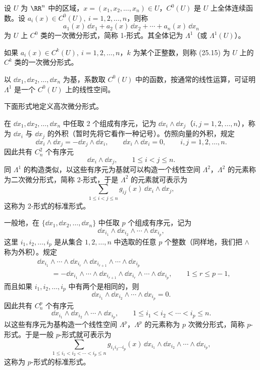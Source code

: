 设 $U$ 为 $\RR^n$ 中的区域，$x=(x_1,x_2,\ldots,x_n)\in U$，$C^0(U)$ 是 $U$ 上全体连续函数。设 $a_i(x)\in C^0(U),\ i=1,2,\ldots,n$，则称
\begin{equation}
  a_1(x)\,\dd x_1+a_2(x)\,\dd x_2+\cdots+a_n(x)\,\dd x_n
  \tag{25.15}
\end{equation}
为 $U$ 上 $C^0$ 类的一次微分形式，简称 1-形式。其全体记为 $\Lambda^1$（或 $\Lambda^1(U)$）。

\begin{xremark}
如果 $a_i(x)\in C^k(U),\ i=1,2,\ldots,n$，$k$ 为某个正整数，则称 (25.15) 为 $U$ 上的 $C^k$ 类的一次微分形式。
\end{xremark}

\begin{xremark}
以 $\dd x_1,\dd x_2,\ldots,\dd x_n$ 为基，系数取 $C^0(U)$ 中的函数，按通常的线性运算，可证明 $\Lambda^1$ 是一个 $C^0(U)$ 上的线性空间。
\end{xremark}

下面形式地定义高次微分形式。

在 $\dd x_1,\dd x_2,\ldots,\dd x_n$ 中任取 2 个组成有序元，记为 $\dd x_i\wedge\dd x_j$（$i,j=1,2,\ldots,n$），称为 $\dd x_i$ 与 $\dd x_j$ 的外积（暂时先将它看作一种记号）。仿照向量的外积，规定
\[
  \dd x_i\wedge\dd x_j=-\dd x_j\wedge\dd x_i,\qquad
  \dd x_i\wedge\dd x_i=0,
  \qquad i,j=1,2,\ldots,n.
\]
因此共有 $C_n^2$ 个有序元
\[
  \dd x_i\wedge\dd x_j,\qquad1\le i<j\le n.
\]
同 $\Lambda^1$ 的构造类似，以这些有序元为基就可以构造一个线性空间 $\Lambda^2$，$\Lambda^2$ 的元素称为二次微分形式，简称 2-形式，于是 $\Lambda^2$ 的元素就可表示为
\[
  \sum_{1\le i<j\le n}g_{ij}(x)\,\dd x_i\wedge\dd x_j,
\]
这称为 2-形式的标准形式。

一般地，在 $\{\dd x_1,\dd x_2,\ldots,\dd x_n\}$ 中任取 $p$ 个组成有序元，记为
\[
  \dd x_{i_1}\wedge\dd x_{i_2}\wedge\cdots\wedge\dd x_{i_p},
\]
这里 $i_1,i_2,\ldots,i_p$ 是从集合 $1,2,\ldots,n$ 中选取的任意 $p$ 个整数（同样地，我们把 $\wedge$ 称为外积）。规定
\begin{align*}
&\dd x_{i_1}\wedge\cdots\wedge\dd x_{i_r}\wedge\dd x_{i_{r+1}}\wedge\cdots\wedge\dd x_{i_p}\\
&\qquad=-\dd x_{i_1}\wedge\cdots\wedge\dd x_{i_{r+1}}\wedge\dd x_{i_r}\wedge\cdots\wedge\dd x_{i_p},\qquad1\le r\le p-1,
\end{align*}
而且如果 $i_1,i_2,\ldots,i_p$ 中有两个是相同的，则
\[
  \dd x_{i_1}\wedge\dd x_{i_2}\wedge\cdots\wedge\dd x_{i_p}=0.
\]
因此共有 $C_n^p$ 个有序元
\[
  \dd x_{i_1}\wedge\dd x_{i_2}\wedge\cdots\wedge\dd x_{i_p},\qquad1\le i_1<i_2<\cdots<i_p\le n.
\]
以这些有序元为基构造一个线性空间 $\Lambda^p$，$\Lambda^p$ 的元素称为 $p$ 次微分形式，简称 $p$-形式。于是一般 $p$-形式就可表示为
\[
  \sum_{1\le i_1<i_2<\cdots<i_p\le n}g_{i_1i_2\cdots i_p}(x)
  \,\dd x_{i_1}\wedge\dd x_{i_2}\wedge\cdots\wedge\dd x_{i_p},
\]
这称为 $p$-形式的标准形式。

